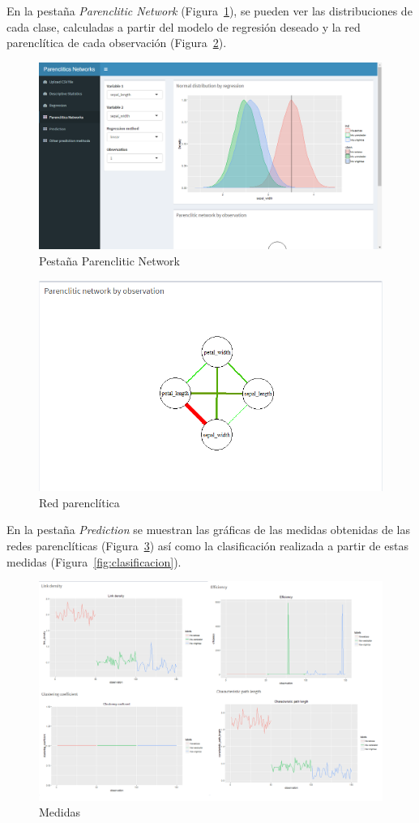 En la pestaña \textit{Parenclitic Network} (Figura~\ref{fig:pn}), se pueden ver las distribuciones de cada clase, calculadas a partir del modelo de regresión deseado y la red parenclítica de cada observación (Figura~\ref{fig:parencliticNetwork}). 

\begin{figure}[tbph!]
	\centering
	\includegraphics[width=0.7\linewidth]{imagenes/pn}
	\caption{Pestaña Parenclitic Network}
	\label{fig:pn}
\end{figure}

\begin{figure}[tbph!]
	\centering
	\includegraphics[width=0.7\linewidth]{imagenes/parencliticNetwork}
	\caption{Red parenclítica}
	\label{fig:parencliticNetwork}
\end{figure}

En la pestaña \textit{Prediction} se muestran las gráficas de las medidas obtenidas de las redes parenclíticas (Figura~\ref{fig:medidas}) así como la clasificación realizada a partir de estas medidas (Figura~\ref{fig:clasificacion}).\\

\begin{figure}[tbph!]
	\centering
	\includegraphics[width=0.7\linewidth]{imagenes/medidas}
	\caption{Medidas}
	\label{fig:medidas}
\end{figure}

